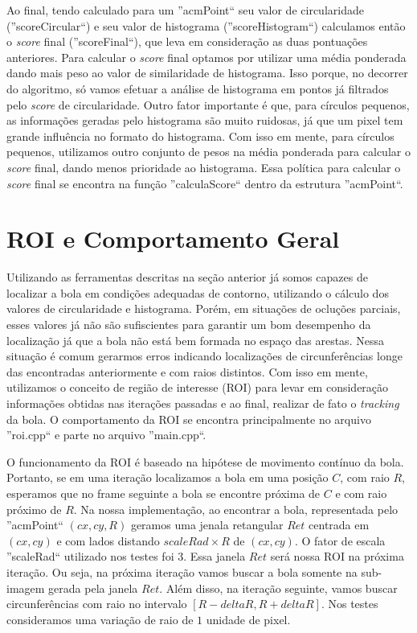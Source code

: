 \documentclass[11pt,a4paper]{article}
\begin{document}
 Ao final, tendo calculado para um ''acmPoint`` seu valor de circularidade (''scoreCircular``) e seu valor de histograma (''scoreHistogram``) calculamos então o \textit{score} final (''scoreFinal``), que leva em consideração as duas pontuações anteriores. Para calcular o \textit{score} final optamos por utilizar uma média ponderada dando mais peso ao valor de similaridade de histograma. Isso porque, no decorrer do algoritmo, só vamos efetuar a análise de histograma em pontos já filtrados pelo \textit{score} de circularidade. Outro fator importante é que, para círculos pequenos, as informações geradas pelo histograma são muito ruidosas, já que um pixel tem grande influência no formato do histograma. Com isso em mente, para círculos pequenos, utilizamos outro conjunto de pesos na média ponderada para calcular o \textit{score} final, dando menos prioridade ao histograma. Essa política para calcular o \textit{score} final se encontra na função ''calculaScore`` dentro da estrutura ''acmPoint``.

\section{ROI e Comportamento Geral}

 Utilizando as ferramentas descritas na seção anterior já somos capazes de localizar a bola em condições adequadas de contorno, utilizando o cálculo dos valores de circularidade e histograma. Porém, em situações de ocluções parciais, esses valores já não são sufiscientes para garantir um bom desempenho da localização já que a bola não está bem formada no espaço das arestas. Nessa situação é comum gerarmos erros indicando localizações de circunferências longe das encontradas anteriormente e com raios distintos. Com isso em mente, utilizamos o conceito de região de interesse (ROI) para levar em consideração informações obtidas nas iterações passadas e ao final, realizar de fato o \textit{tracking} da bola. O comportamento da ROI se encontra principalmente no arquivo ''roi.cpp`` e parte no arquivo ''main.cpp``.

 O funcionamento da ROI é baseado na hipótese de movimento contínuo da bola. Portanto, se em uma iteração localizamos a bola em uma posição $C$, com raio $R$, esperamos que no frame seguinte a bola se encontre próxima de $C$ e com raio próximo de $R$. Na nossa implementação, ao encontrar a bola, representada pelo ''acmPoint`` $(cx,cy,R)$ geramos uma jenala retangular $Ret$ centrada em $(cx,cy)$ e com lados distando $scaleRad\times R$ de $(cx,cy)$. O fator de escala ''scaleRad`` utilizado nos testes foi $3$. Essa janela $Ret$ será nossa ROI na próxima iteração. Ou seja, na próxima iteração vamos buscar a bola somente na sub-imagem gerada pela janela $Ret$. Além disso, na iteração seguinte, vamos buscar circunferências com raio no intervalo $[R-deltaR,R+deltaR]$. Nos testes consideramos uma variação de raio de $1$ unidade de pixel.
\end{document}
